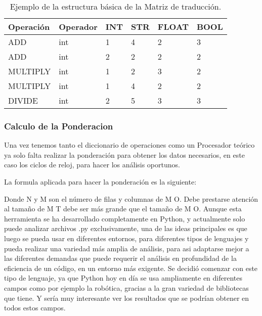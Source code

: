 \begin{table}[htbp]
\begin{center}
\begin{tabular}{|l|l|l|l|l|l|}
\hline
Operación & Operador & INT & STR & FLOAT & BOOL \\
\hline \hline
ADD & int & 1 & 4 & 2 & 3\\ \hline
ADD & int & 2 & 2 & 2 & 2 \\ \hline
MULTIPLY & int & 1 & 2 & 3 & 2 \\ \hline
MULTIPLY & int & 1 & 4 & 2 & 2 \\ \hline
DIVIDE & int & 2 & 5 & 3 & 3 \\ \hline
\end{tabular}
\caption{Ejemplo de la estructura básica de la Matriz de traducción.}

\label{tabla:sencilla}
\end{center}
\end{table}



\subsubsection{Calculo de la Ponderacion}
Una vez tenemos tanto el diccionario de operaciones como un Procesador teórico ya solo falta realizar la ponderación para obtener los datos necesarios, en este caso los ciclos de reloj, para hacer los análisis oportunos. 

La formula aplicada para hacer la ponderación es la siguiente:


Donde N y M son el número de filas y columnas de M O. Debe prestarse atención al tamaño de M T debe ser más grande que el tamaño de M O.
Aunque esta herramienta se ha desarrollado completamente en Python, y actualmente solo puede analizar archivos .py exclusivamente, una de las ideas principales es que luego se pueda usar en diferentes entornos, para diferentes tipos de lenguajes y pueda realizar una variedad más amplia de análisis, para asi adaptarse mejor a las diferentes demandas que puede requerir el análisis en profundidad de la eficiencia de un código, en un entorno más exigente. Se decidió comenzar con este tipo de lenguaje, ya que Python hoy en día se usa ampliamente en diferentes campos como por ejemplo la robótica, gracias a la gran variedad de bibliotecas que tiene. Y sería muy interesante ver los resultados que se podrían obtener en todos estos campos.


